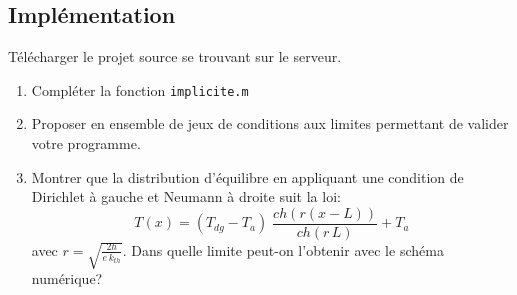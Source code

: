 \documentclass[a4paper, 10pt]{article}
\begin{document}
\subsection{Implémentation}

Télécharger le projet source se trouvant sur le serveur.\\

\begin{enumerate}
\item Compléter la fonction \tt{implicite.m} \rm

\item Proposer en ensemble de jeux de conditions aux limites permettant de valider votre programme.


\item Montrer que la distribution d'équilibre en appliquant une condition de Dirichlet à gauche et Neumann à droite suit la loi:
\begin{equation}\label{sch1}
T(x)=\left( {{T_{dg}} - {T_a}} \right)\;\frac{{ch\left( {r\left( {x - L} \right)} \right)}}{{ch\left( {r\,L} \right)}} + {T_a}
\end{equation}
avec 
$r = \sqrt {\frac{{2h}}{{e\,{k_{th}}}}} $. Dans quelle limite peut-on l'obtenir avec le schéma numérique?
\end{enumerate}
\end{document}
